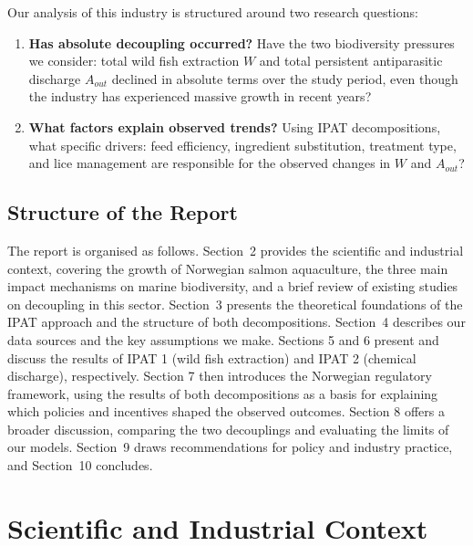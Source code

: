 \documentclass[12pt, a4paper]{report}
\begin{document}
Our analysis of this industry is structured around two research questions: 

\begin{enumerate}
    \item \textbf{Has absolute decoupling occurred?} Have the two biodiversity pressures we consider: total wild fish extraction \(W\) and total persistent antiparasitic discharge \(A_{out}\) declined in absolute terms over the study period, even though the industry has experienced massive growth in recent years?

    \item \textbf{What factors explain observed trends?} Using IPAT
    decompositions, what specific drivers: feed efficiency, ingredient
    substitution, treatment type, and lice management are responsible for the
    observed changes in \(W\) and \(A_{out}\)?
\end{enumerate}

\section{Structure of the Report} 

The report is organised as follows. Section~2 provides the scientific
and industrial context, covering the growth of Norwegian salmon
aquaculture, the three main impact mechanisms on marine biodiversity,
and a brief review of existing studies on decoupling in this sector.
Section~3 presents the theoretical foundations of the IPAT approach
and the structure of both decompositions. Section~4 describes our
data sources and the key assumptions we make. Sections 5 and 6 present and discuss the results of IPAT 1 (wild fish extraction) and IPAT 2 (chemical discharge), respectively. Section 7 then introduces the Norwegian regulatory framework, using the results of both decompositions as a basis for explaining which policies and incentives shaped the observed outcomes. Section 8 offers a broader discussion, comparing the two decouplings and evaluating the limits of our models. Section~9 draws recommendations for policy and industry practice, and Section~10
concludes.




\chapter{Scientific and Industrial Context}
\end{document}
